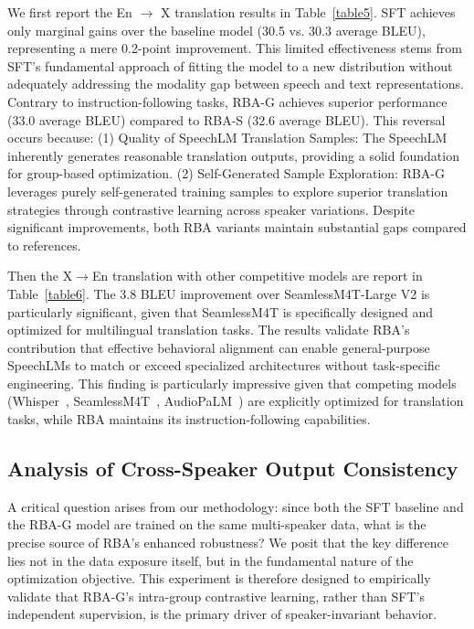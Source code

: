 \documentclass[letterpaper]{article} %
\begin{document}
We first report the En $\rightarrow$ X translation results in Table~\ref{table5}. SFT achieves only marginal gains over the baseline model (30.5 vs. 30.3 average BLEU), representing a mere 0.2-point improvement. This limited effectiveness stems from SFT's fundamental approach of fitting the model to a new distribution without adequately addressing the modality gap between speech and text representations. Contrary to instruction-following tasks, RBA-G achieves superior performance (33.0 average BLEU) compared to RBA-S (32.6 average BLEU). This reversal occurs because: (1) Quality of SpeechLM Translation Samples: The SpeechLM inherently generates reasonable translation outputs, providing a solid foundation for group-based optimization. (2) Self-Generated Sample Exploration: RBA-G leverages purely self-generated training samples to explore superior translation strategies through contrastive learning across speaker variations. Despite significant improvements, both RBA variants maintain substantial gaps compared to references. \par

Then the X$\rightarrow$En translation with other competitive models are report in Table~\ref{table6}. The 3.8 BLEU improvement over SeamlessM4T-Large V2 is particularly significant, given that SeamlessM4T is specifically designed and optimized for multilingual translation tasks. The results validate RBA's contribution that effective behavioral alignment can enable general-purpose SpeechLMs to match or exceed specialized architectures without task-specific engineering. This finding is particularly impressive given that competing models (Whisper~\cite{radford2023robust}, SeamlessM4T~\cite{barrault2023seamlessm4t}, AudioPaLM~\cite{rubenstein2023audiopalm}) are explicitly optimized for translation tasks, while RBA maintains its instruction-following capabilities. 

\subsection{Analysis of Cross-Speaker Output Consistency}
A critical question arises from our methodology: since both the SFT baseline and the RBA-G model are trained on the same multi-speaker data, what is the precise source of RBA's enhanced robustness? We posit that the key difference lies not in the data exposure itself, but in the fundamental nature of the optimization objective. This experiment is therefore designed to empirically validate that RBA-G's intra-group contrastive learning, rather than SFT's independent supervision, is the primary driver of speaker-invariant behavior.
\end{document}
